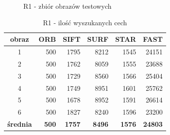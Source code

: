 \begin{figure}[!htbp]
\begin{center}
{}
\caption{R1 - zbiór obrazów testowych}
\label{fig:r1_set}
\end{center}
\end{figure}

\begin{table}[htbp]
  \centering
  \caption{R1 - ilość wyszukanych cech}
    \begin{tabular}{|c|r|r|r|r|r|}\hline
    
    obraz & \textbf{ORB} & \textbf{SIFT} & \textbf{SURF} & \textbf{STAR} & \textbf{FAST} \\\hline
   
    1 & 500 & 1795 & 8212 & 1545 & 24151 \\
    2 & 500 & 1762 & 8059 & 1555 & 23688 \\
    3 & 500 & 1729 & 8560 & 1566 & 25404 \\
    4 & 500 & 1749 & 8951 & 1601 & 25762 \\
    5 & 500 & 1678 & 8952 & 1591 & 26614 \\
    6 & 500 & 1827 & 8240 & 1596 & 23200 \\\hline
    \textbf{średnia} & \textbf{500} & \textbf{1757} & \textbf{8496} & \textbf{1576} & \textbf{24803} \\
   \hline
    \end{tabular}%
  \label{tab:r1_f1}%
\end{table}%


